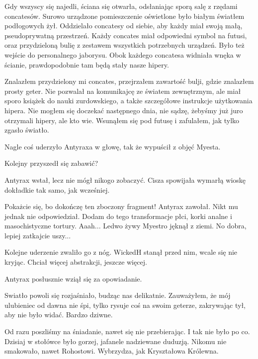 Gdy wszyscy się najedli, ściana się otwarła, odsłaniając sporą salę z rzędami concatesów.
Surowo urządzone pomieszczenie oświetlone było białym światłem podłogowych żył.
Oddzielało concatesy od siebie, aby każdy miał swoją małą, pseudoprywatną przestrzeń.
Każdy concates miał odpowiedni symbol na futusi, oraz przydzieloną bulię z zestawem wszystkich potrzebnych urządzeń.
Było też wejście do personalnego jaborysu.
Obok każdego concatesa widniała wnęka w ścianie, prawdopodobnie tam będą stały nasze hipery.

Znalazłem przydzielony mi concates, przejrzałem zawartość bulji, gdzie znalazłem prosty geter.
Nie pozwalał na komunikajcę ze światem zewnętrznym, ale miał sporo książek do nauki zurdowskiego, a także szczegółowe instrukcje użytkowania hipera.
Nie mogłem się doczekać następnego dnia, nie sądzę, żebyśmy już juro otrzymali hipery, ale kto wie.
Wsunąłem się pod futusę i zafulałem, jak tylko zgasło światło.

\divider{}

Nagle coś uderzyło Antyraxa w głowę, tak że wypuścił z objęć Myesta.

Kolejny przyszedł się zabawić?

Antyrax wstał, lecz nie mógł nikogo zobaczyć.
Cisza spowijała wymarłą wioskę dokładkie tak samo, jak wcześniej.

\begin{dialogue}
\ds{} Pokażcie się, bo dokończę ten zboczony fragment! \dm{} Antyrax zawołał. Nikt mu jednak nie odpowiedział. \dm{} Dodam do tego transformacje płci, korki analne i masochistyczne tortury.
\ds{} Aaah... \dm{} Ledwo żywy Myestro jęknął z ziemi.
\ds{} No dobra, lepiej zatkajcie uszy...
\end{dialogue}

Kolejne uderzenie zwaliło go z nóg. 
WickedH stanął przed nim, wcale się nie kryjąc.
Chciał więcej abstrakcji, jeszcze więcej.

Antyrax posłusznie wziął się za opowiadanie.

\divider{}

Swiatło powoli się rozjaśniało, budząc nas delikatnie.
Zauważyłem, że mój ulubieniec od dawna nie śpi, tylko rysuje coś na swoim geterze, zakrywając tył, aby nie było widać.
Bardzo dziwne.

Od razu poszliśmy na śniadanie, nawet się nie przebierając. I tak nie było po co.
Dzisiaj w stołówce było gorzej, jafanele nadziewane duduzją.
Nikomu nie smakowało, nawet Rohostowi. Wybrzydza, jak Kryształowa Królewna.

